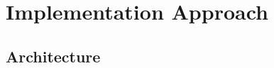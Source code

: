 \chapter{Implementation Approach}
\label{chap:implementation}


\section{Architecture} \label{sec:Arch}



